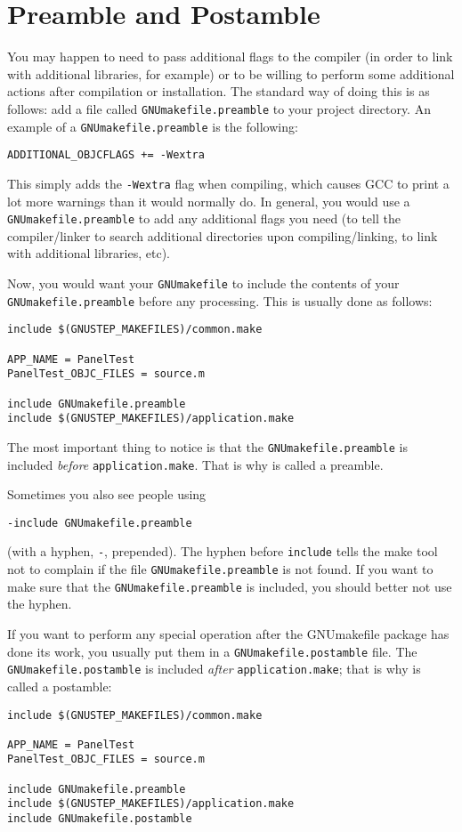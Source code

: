 \documentclass[a4paper]{article}
\begin{document}
\section{Preamble and Postamble}
You may happen to need to pass additional flags to the compiler (in
order to link with additional libraries, for example) or to be willing
to perform some additional actions after compilation or installation.
The standard way of doing this is as follows: add a file called
\texttt{GNUmakefile.preamble} to your project directory.  An example
of a \texttt{GNUmakefile.preamble} is the following:
\begin{verbatim}
ADDITIONAL_OBJCFLAGS += -Wextra
\end{verbatim}
This simply adds the \texttt{-Wextra} flag when compiling, which
causes GCC to print a lot more warnings than it would normally do.  In
general, you would use a \texttt{GNUmakefile.preamble} to add any
additional flags you need (to tell the compiler/linker to search
additional directories upon compiling/linking, to link with additional
libraries, etc).

Now, you would want your \texttt{GNUmakefile} to include the contents
of your \texttt{GNUmakefile.preamble} before any processing.  This is
usually done as follows:
\begin{verbatim}
include $(GNUSTEP_MAKEFILES)/common.make

APP_NAME = PanelTest
PanelTest_OBJC_FILES = source.m

include GNUmakefile.preamble
include $(GNUSTEP_MAKEFILES)/application.make
\end{verbatim}

The most important thing to notice is that the
\texttt{GNUmakefile.preamble} is included \emph{before}
\texttt{application.make}.  That is why is called a preamble.

Sometimes you also see people using 
\begin{verbatim}
-include GNUmakefile.preamble
\end{verbatim}
(with a hyphen, \texttt{-}, prepended).  The hyphen before
\texttt{include} tells the make tool not to complain if the file
\texttt{GNUmakefile.preamble} is not found.  If you want to make sure
that the \texttt{GNUmakefile.preamble} is included, you should better
not use the hyphen.

If you want to perform any special operation after the GNUmakefile
package has done its work, you usually put them in a
\texttt{GNUmakefile.postamble} file.  The
\texttt{GNUmakefile.postamble} is included \emph{after}
\texttt{application.make}; that is why is called a postamble:
\begin{verbatim}
include $(GNUSTEP_MAKEFILES)/common.make

APP_NAME = PanelTest
PanelTest_OBJC_FILES = source.m

include GNUmakefile.preamble
include $(GNUSTEP_MAKEFILES)/application.make
include GNUmakefile.postamble
\end{verbatim}
\end{document}
